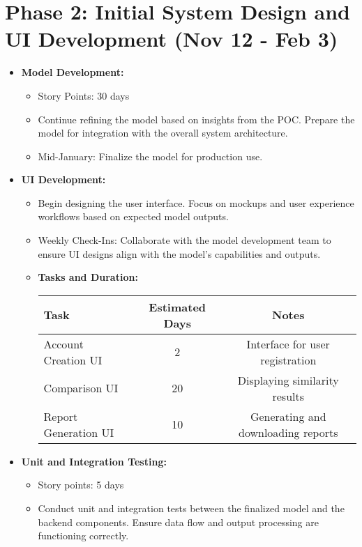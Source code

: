 \documentclass[12pt]{article}
\begin{document}
\section*{Phase 2: Initial System Design and UI Development (Nov 12 - Feb 3)}
\begin{itemize}
    \item \textbf{Model Development:}
    \begin{itemize}
        \item Story Points: 30 days
        \item Continue refining the model based on insights from the POC. Prepare the model for integration with the overall system architecture.
        \item Mid-January: Finalize the model for production use.
    \end{itemize}

    \item \textbf{UI Development:}
    \begin{itemize}
        \item Begin designing the user interface. Focus on mockups and user experience workflows based on expected model outputs.
        \item Weekly Check-Ins: Collaborate with the model development team to ensure UI designs align with the model's capabilities and outputs.
        \item \textbf{Tasks and Duration:}

        \begin{tabular}{|>{\raggedright}p{4cm}|c|c|}
            \hline
            \textbf{Task} & \textbf{Estimated Days} & \textbf{Notes} \\
            \hline
            Account Creation UI & 2 & Interface for user registration \\
            Comparison UI & 20 & Displaying similarity results \\
            Report Generation UI & 10 & Generating and downloading reports \\
            \hline
        \end{tabular}
    \end{itemize}

    \item \textbf{Unit and Integration Testing:}
    \begin{itemize}
        \item Story points: 5 days
        \item Conduct unit and integration tests between the finalized model and the backend components. Ensure data flow and output processing are functioning correctly.
    \end{itemize}
\end{itemize}
\end{document}
